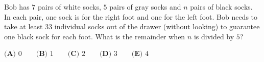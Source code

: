 Bob has $7$ pairs of white socks, $5$ pairs of gray socks and $n$ pairs of black socks. In each pair, one sock is for the right foot and one for the left foot. Bob needs to take at least $33$ individual socks out of the drawer (without looking) to guarantee one black sock for each foot. What is the remainder when $n$ is divided by $5$?

$\textbf{(A) }0\qquad\textbf{(B) }1\qquad\textbf{(C) }2\qquad\textbf{(D) }3\qquad\textbf{(E) }4$
